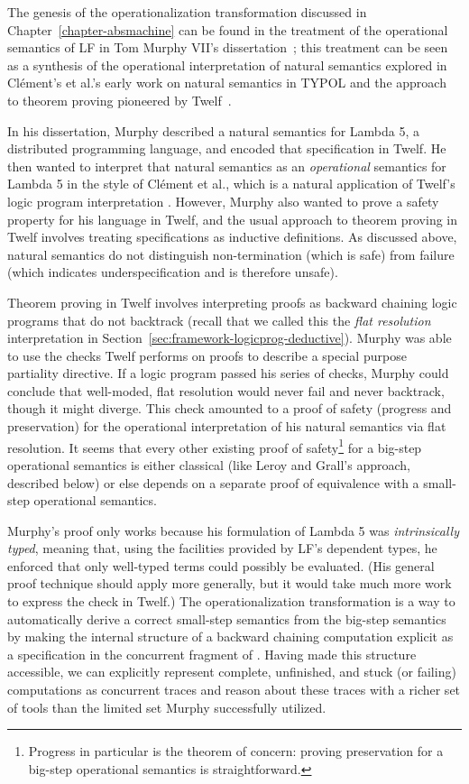 The genesis of the operationalization transformation discussed in
Chapter~\ref{chapter-absmachine} can be found in the treatment of the
operational semantics of LF in Tom Murphy VII's
dissertation~\cite{murphy08modal}; this treatment can be seen as a
synthesis of the operational interpretation of natural semantics
explored in Cl\'ement's et al.'s early work on natural semantics in
TYPOL and the approach to theorem proving pioneered by
Twelf~\cite{pfenning99system}.

In his dissertation, Murphy described a natural semantics for Lambda 5, a
distributed programming language, and encoded that specification in
Twelf. He then wanted to interpret that natural semantics as an {\it
  operational} semantics for Lambda 5 in the style of Cl\'ement et
al., which is a natural application of Twelf's logic program
interpretation \cite{michaylov91natural}.  However, Murphy also wanted
to prove a safety property for his language in Twelf, and the usual
approach to theorem proving in Twelf involves treating specifications
as inductive definitions. As discussed above, natural semantics do not
distinguish non-termination (which is safe) from failure (which
indicates underspecification and is therefore unsafe).

Theorem proving in Twelf involves interpreting proofs as backward
chaining logic programs that do not backtrack (recall that we called
this the {\it flat resolution} interpretation in
Section~\ref{sec:framework-logicprog-deductive}).  Murphy was able to
use the checks Twelf performs on proofs to describe a special purpose
partiality directive. If a logic program passed his series of checks,
Murphy could conclude that well-moded, flat resolution would
never fail and never backtrack, though it might diverge. This check
amounted to a proof of safety (progress and preservation) for the
operational interpretation of his natural semantics via flat
resolution. It seems that every other existing proof of
safety\footnote{Progress in particular is the theorem of concern:
  proving preservation for a big-step operational semantics is
  straightforward.} for a big-step operational semantics is either
classical (like Leroy and Grall's approach, described below) or else
depends on a separate proof of equivalence with a small-step
operational semantics.

Murphy's proof only works because his formulation of Lambda 5 was {\it
  intrinsically typed}, meaning that, using the facilities provided by
LF's dependent types, he enforced that only well-typed terms could
possibly be evaluated. (His general proof technique should apply more
generally, but it would take much more work to express the check in
Twelf.)  The operationalization transformation is a way to
automatically derive a correct small-step semantics from the big-step
semantics by making the internal structure of a backward chaining
computation explicit as a specification in the concurrent fragment of
\sls. Having made this structure accessible, we can explicitly
represent complete, unfinished, and stuck (or failing) computations as
concurrent traces and reason about these traces with a richer set of
tools than the limited set Murphy successfully utilized.


